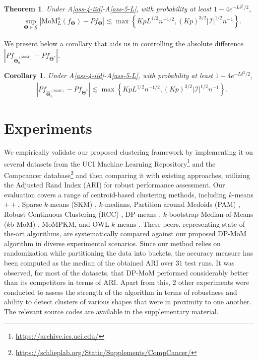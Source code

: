 \documentclass{article}
\newcommand{\bTheta}{\boldsymbol{\Theta}}
\newcommand{\I}{\mathcal{I}}
\newcommand{\tm}{\widehat{\bTheta}_n^{(\text{MoM})}}
\newtheorem{thm}{Theorem}[section]
\newtheorem{cor}{Corollary}[section]
\begin{document}
\begin{thm}\label{thm-4-MoM}
Under A\ref{ass-4-iid}-A\ref{ass-5-L}, with probability at least $1-4e^{-L \delta^2/2}$, 
\begin{align*}
    &\sup_{\bTheta \in \mathscr{G}} \left|\text{MoM}^n_L (f_{\bTheta}) - Pf_{\bTheta} \right|\lesssim  \max\left\{ Kp L^{1/2}n^{-1/2}, (Kp)^{3/2}  |\I|^{1/2}n^{-1}\right\}.
\end{align*}
\end{thm}

We present below a corollary that aids us in controlling the absolute difference $|P f_{\tm} - P f_{\bTheta^\ast}|$.

\begin{cor}
Under A\ref{ass-4-iid}-A\ref{ass-5-L}, with  probability at least $1-4e^{-L \delta^2/2}$,
\begin{align*}
    &\left|P f_{\tm} - P f_{\bTheta^\ast}\right|\lesssim \max\left\{ KpL^{1/2}n^{-1/2}, (Kp)^{3/2} |\I|^{1/2}n^{-1}\right\}.
\end{align*}
\end{cor}


\section{Experiments}
\label{sec:experiments}
We empirically validate our proposed clustering framework by implementing it on several datasets from the UCI Machine Learning Repository\footnote{\url{https://archive.ics.uci.edu/}} and the Compcancer database\footnote{\url{https://schlieplab.org/Static/Supplements/CompCancer/}} and then comparing it with existing approaches, utilizing the Adjusted Rand Index (ARI) for robust performance assessment. Our evaluation covers a range of centroid-based clustering methods, including $k$-means$++$, Sparse $k$-means (SKM) \citep{SKM-paper}, $k$-medians, Partition around Medoids (PAM) \citep{PAM-paper}, Robust Continuous Clustering (RCC) \citep{Shah2017-jj}, DP-means \citep{DP-Means}, $k$-bootstrap Median-of-Means ($k$b-MoM) \citep{brunetsaumard2020kbmom}, MoMPKM, and OWL $k$-means \citep{pmlr-v206-chakraborty23a}. These peers, representing state-of-the-art algorithms, are systematically compared against our proposed DP-MoM algorithm in diverse experimental scenarios. %
Since our method relies on randomization while partitioning the data into buckets, the accuracy measure has been computed as the median of the obtained ARI over $31$ test runs. It was observed, for most of the datasets, that DP-MoM performed considerably better than its competitors in terms of ARI. Apart from this, 2 other experiments were conducted to assess the strength of the algorithm in terms of robustness and ability to detect clusters of various shapes that were in proximity to one another. The relevant source codes are available in the supplementary material. 
\end{document}
